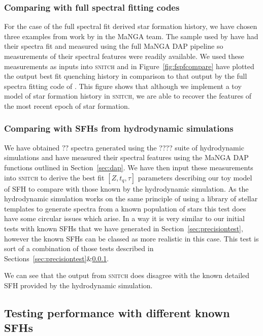 \documentclass[useAMS,usenatbib]{mn2e}
\begin{document}
\subsubsection{Comparing with full spectral fitting codes}\label{sec:fspftest}


For the case of the full spectral fit derived star formation history, we have chosen three examples from work by \cite{?} in the MaNGA team. The sample used by \citeauthor{?} have had their spectra fit and measured using the full MaNGA DAP pipeline \citep{westfall18} so measurements of their spectral features were readily available. We used these measurements as inputs into \textsc{snitch} and in Figure~\ref{fig:fspfcompare} have plotted the output best fit quenching history in comparison to that output by the full spectra fitting code of \cite{?}. This figure shows that although we implement a toy model of star formation history in \textsc{snitch}, we are able to recover the features of the most recent epoch of star formation.  

\subsubsection{Comparing with SFHs from hydrodynamic simulations}

We have obtained $??$ spectra generated using the ???? suite of hydrodynamic simulations and have measured their spectral features using the MaNGA DAP functions outlined in Section~\ref{sec:dap}. We have then input these measurements into \textsc{snitch} to derive the best fit $[Z, t_q, \tau]$ parameters describing our toy model of SFH to compare with those known by the hydrodynamic simulation. As the hydrodynamic simulation works on the same principle of using a library of stellar templates to generate spectra from a known population of stars this test does have some circular issues which arise. In a way it is very similar to our initial tests with known SFHs that we have generated in Section~\ref{sec:precisiontest}, however the known SFHs can be classed as more realistic in this case. This test is sort of a combination of those tests described in Sections~\ref{sec:precisiontest}\&\ref{sec:fspftest}.

We can see that the output from \textsc{snitch} does {dis}agree with the known detailed SFH provided by the hydrodynamic simulation.


\subsection{Testing performance with different known SFHs}
\end{document}
